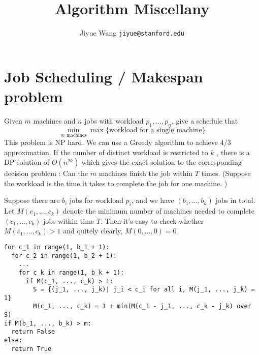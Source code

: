 \documentclass[12pt]{article}
\title{Algorithm Miscellany}
\author{Jiyue Wang \texttt{jiyue@stanford.edu}}
\begin{document}
\maketitle

\section{Job Scheduling / Makespan problem}
Given $m$ machines and $n$ jobs with workload $p_1, ..., p_n$, give a schedule that 
\[
  \min_{\text{$m$ machines}} \max \{ \text{workload for a single machine}\}
\]
This problem is NP hard. We can use a Greedy algorithm to achieve $4/3$ approximation. If the number of distinct workload is restricted to $k$ , there is a DP solution of $O(n^{2k})$ which gives the exact solution to the corresponding decision problem : Can the $m$ machines finish the job within $T$ times. (Suppose the workload is the time it takes to complete the job for one machine. )

Suppose there are $b_i$ jobs for workload $p_i$, and we have $(b_1, ..., b_k)$ jobs in total. Let $M(c_1, ..., c_k)$ denote the minimum number of machines needed to complete $(c_1, ..., c_k)$ jobs within time $T$. Then it's easy to check whether $M(c_1, ..., c_k) > 1$ and quitely clearly, $M(0, ..., 0) = 0$

\begin{lstlisting}[frame=single]
for c_1 in range(1, b_1 + 1):
  for c_2 in range(1, b_2 + 1):
    ...
    for c_k in range(1, b_k + 1):
      if M(c_1, ..., c_k) > 1:
        S = {(j_1, ..., j_k)| j_i < c_i for all i, M(j_1, ..., j_k) = 1}
        M(c_1, ..., c_k) = 1 + min(M(c_1 - j_1, ..., c_k - j_k) over S)
if M(b_1, ..., b_k) > m:
  return False
else:
  return True

\end{lstlisting}
\end{document}
